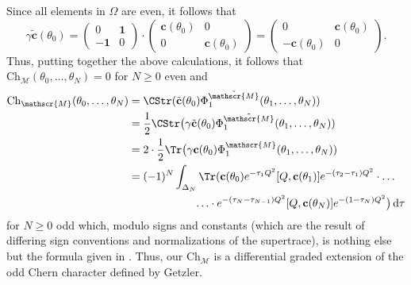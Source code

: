 \documentclass[a4paper, english, 12pt, bibliography=totocnumbered,
index=totoc]{scrartcl}
\begin{document}
Since all elements in $\Omega$ are even, it follows that
\begin{equation*}
	\gamma \tilde{\mathbf{c}}(\theta_0) =
	\begin{pmatrix}
		0 & \mathbf{1} \\
		-\mathbf{1} & 0
	\end{pmatrix}
	\cdot
	\begin{pmatrix}
		\mathbf{c}(\theta_0) & 0 \\
		0 & \mathbf{c}(\theta_0)
	\end{pmatrix}
	=
	\begin{pmatrix}
		0 & \mathbf{c}(\theta_0) \\
		-\mathbf{c}(\theta_0) & 0
	\end{pmatrix}.
\end{equation*}
Thus, putting together the above calculations, it follows that
$\mathrm{Ch}_{\mathscr{M}}(\theta_0, \ldots, \theta_N) = 0$ for $N \geq 0$ even
and
\begin{align*}
	\mathrm{Ch}_{\mathscr{M}}(\theta_0, \ldots, \theta_N) & =
	\CStr(\tilde{\mathbf{c}}(\theta_0)
	\Phi_1^{\tilde{\mathscr{M}}}(\theta_1, \ldots, \theta_N)) \\
	& = \frac 12
	\CStr\big(\gamma \tilde{\mathbf{c}}(\theta_0)
	\Phi_1^{\tilde{\mathscr{M}}}(\theta_1, \ldots, \theta_N)) \\
	& = 2 \cdot \frac 12 \Tr\big(\gamma \mathbf{c}(\theta_0)
	\Phi_1^{\mathscr{M}}(\theta_1, \ldots, \theta_N)) \\
	& = (-1)^N\int_{\Delta_N} \Tr(\mathbf{c}(\theta_0)e^{-\tau_1 Q^2}[Q,
	\mathbf{c}(\theta_1)]e^{-(\tau_2 - \tau_1) Q^2} \cdot \ldots \\
	& \qquad \qquad \qquad \ldots \cdot
	e^{-(\tau_N - \tau_{N-1})Q^2}[Q,
	\mathbf{c}(\theta_N)]e^{-(1 - \tau_N)Q^2}\big) \, \mathrm{d} \tau
\end{align*}
for $N \geq 0$ odd which, modulo signs and constants (which are the result of
differing sign conventions and normalizations of the supertrace), is nothing
else but the formula given in \cite[Definition 4.1, Proposition
4.2]{GetzlerOdd}.
Thus, our $\mathrm{Ch}_{\mathscr{M}}$ is a differential graded extension
of the odd Chern character defined by Getzler.
\end{document}
